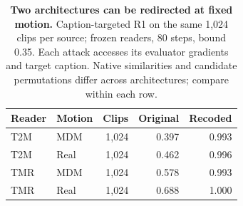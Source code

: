 \begin{table}[t]
\centering\footnotesize
\caption{\textbf{Two architectures can be redirected at fixed motion.} Caption-targeted R1 on the same 1,024 clips per source; frozen readers, 80 steps, bound 0.35. Each attack accesses its evaluator gradients and target caption. Native similarities and candidate permutations differ across architectures; compare within each row.}\label{tab:editorialretrieval}
\begin{tabular}{@{}llrrr@{}}\toprule
Reader&Motion&Clips&Original&Recoded\\\midrule
T2M&MDM&1,024&0.397&0.993\\
T2M&Real&1,024&0.462&0.996\\
\midrule
TMR&MDM&1,024&0.578&0.993\\
TMR&Real&1,024&0.688&1.000\\
\bottomrule\end{tabular}\end{table}

